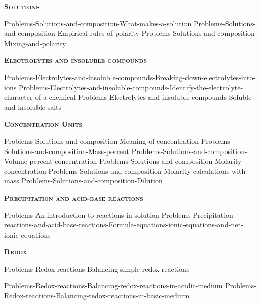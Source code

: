 \documentclass[main.tex]{subfiles}
\begin{document}
\newpage
\setdoublesep{0.35700 em}  %
\setatomsep{1.78500 em}    %
\setbondoffset{0.18265 em} %
\newcommand{\bondwidth}{0.06642 em} %
\setbondstyle{line width = \bondwidth}
\fancyhfoffset[E,O]{0pt}
\setlength{\columnsep}{30pt}
\begin{conclusion}
\end{conclusion}
\begin{multicols*}{2}\setcounter{numA}{1}


{\raggedright\textsc{\textbf{Solutions }}\par}
{Problems-Solutions-and-composition-What-makes-a-solution}
{Problems-Solutions-and-composition-Empirical-rules-of-polarity}
{Problems-Solutions-and-composition-Mixing-and-polarity}


{\raggedright\textsc{\textbf{Electrolytes and insoluble compounds}}\par}
{Problems-Electrolytes-and-insoluble-compounds-Breaking-down-electrolytes-into-ions}
{Problems-Electrolytes-and-insoluble-compounds-Identify-the-electrolyte-character-of-a-chemical}
{Problems-Electrolytes-and-insoluble-compounds-Soluble-and-insoluble-salts}


{\raggedright\textsc{\textbf{Concentration Units }}\par}
{Problems-Solutions-and-composition-Meaning-of-concentration}
{Problems-Solutions-and-composition-Mass-percent}
{Problems-Solutions-and-composition-Volume-percent-concentration}
{Problems-Solutions-and-composition-Molarity-concentration}
{Problems-Solutions-and-composition-Molarity-calculations-with-mass}
{Problems-Solutions-and-composition-Dilution}



{\raggedright\textsc{\textbf{Precipitation and acid-base reactions}}\par}
{Problems-An-introduction-to-reactions-in-solution}
{Problems-Precipitation-reactions-and-acid-base-reactions-Formula-equations-ionic-equations-and-net-ionic-equations}
{\raggedright\textsc{\textbf{Redox}}\par}
{Problems-Redox-reactions-Balancing-simple-redox-reactions}

{Problems-Redox-reactions-Balancing-redox-reactions-in-acidic-medium}
{Problems-Redox-reactions-Balancing-redox-reactions-in-basic-medium}









\end{multicols*}
\end{document}
